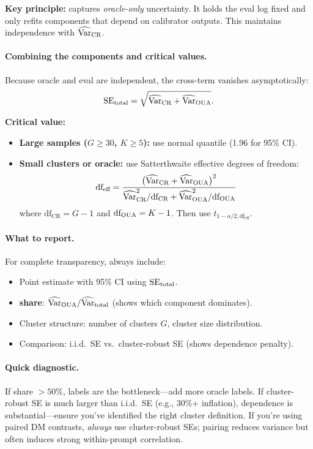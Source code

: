 \textbf{Key principle:} \oua{} captures \emph{oracle-only} uncertainty. It holds the eval log fixed and only refits components that depend on calibrator outputs. This maintains independence with $\widehat{\operatorname{Var}}_{\text{CR}}$.

\paragraph{Combining the components and critical values.}

Because oracle and eval are independent, the cross-term vanishes asymptotically:
\begin{equation}
\operatorname{SE}_{\text{total}} = \sqrt{\widehat{\operatorname{Var}}_{\text{CR}} + \widehat{\operatorname{Var}}_{\text{OUA}}}.
\end{equation}

\textbf{Critical value:}
\begin{itemize}
\item \textbf{Large samples ($G \ge 30$, $K \ge 5$):} use normal quantile (1.96 for 95\% CI).
\item \textbf{Small clusters or oracle:} use Satterthwaite effective degrees of freedom:
\begin{equation}
\text{df}_{\text{eff}} = \frac{\bigl(\widehat{\operatorname{Var}}_{\text{CR}} + \widehat{\operatorname{Var}}_{\text{OUA}}\bigr)^2}
{\widehat{\operatorname{Var}}_{\text{CR}}^2/\text{df}_{\text{CR}} + \widehat{\operatorname{Var}}_{\text{OUA}}^2/\text{df}_{\text{OUA}}}
\end{equation}
where $\text{df}_{\text{CR}} = G-1$ and $\text{df}_{\text{OUA}} = K-1$. Then use $t_{1-\alpha/2, \text{df}_{\text{eff}}}$.
\end{itemize}

\paragraph{What to report.} For complete transparency, always include:
\begin{itemize}
\item Point estimate with 95\% CI using $\operatorname{SE}_{\text{total}}$.
\item \textbf{\oua{} share}: $\widehat{\operatorname{Var}}_{\text{OUA}}/\widehat{\operatorname{Var}}_{\text{total}}$ (shows which component dominates).
\item Cluster structure: number of clusters $G$, cluster size distribution.
\item Comparison: i.i.d.\ SE vs.\ cluster-robust SE (shows dependence penalty).
\end{itemize}

\paragraph{Quick diagnostic.} If \oua{} share $> 50\%$, labels are the bottleneck---add more oracle labels. If cluster-robust SE is much larger than i.i.d.\ SE (e.g., 30\%+ inflation), dependence is substantial---ensure you've identified the right cluster definition. If you're using paired DM contrasts, \emph{always} use cluster-robust SEs; pairing reduces variance but often induces strong within-prompt correlation.

